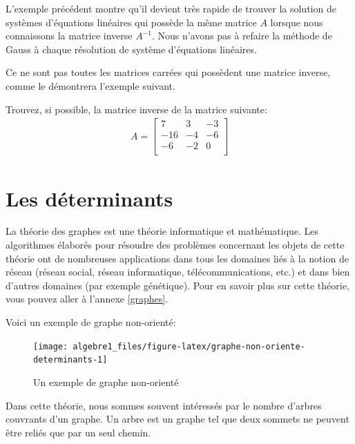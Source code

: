 \documentclass[]{book}
\theoremstyle{definition}
\theoremstyle{definition}
\theoremstyle{definition}
\theoremstyle{remark}
\let\BeginKnitrBlock\begin \let\EndKnitrBlock\end
\begin{document}
L'exemple précédent montre qu'il devient très rapide de trouver la solution de systèmes d'équations linéaires qui possède la même matrice \(A\) lorsque nous connaissons la matrice inverse \(A^{-1}\). Nous n'avons pas à refaire la méthode de Gauss à chaque résolution de système d'équations linéaires.

Ce ne sont pas toutes les matrices carrées qui possèdent une matrice inverse, comme le démontrera l'exemple suivant.

\BeginKnitrBlock{example}
\protect\hypertarget{exm:unnamed-chunk-83}{}{\label{exm:unnamed-chunk-83} }Trouvez, si possible, la matrice inverse de la matrice suivante:
\begin{align*}
A=\begin{bmatrix}
7&3&-3\\
-16&-4&-6\\
-6&-2&0\\
\end{bmatrix}
\end{align*}
\EndKnitrBlock{example}

\hypertarget{determinants}{%
\chapter{Les déterminants}\label{determinants}}

La théorie des graphes est une théorie informatique et mathématique. Les algorithmes élaborés pour résoudre des problèmes concernant les objets de cette théorie ont de nombreuses applications dans tous les domaines liés à la notion de réseau (réseau social, réseau informatique, télécommunications, etc.) et dans bien d'autres domaines (par exemple génétique). Pour en savoir plus sur cette théorie, vous pouvez aller à l'annexe \ref{graphes}.

Voici un exemple de graphe non-orienté:

\begin{figure}

{\centering \texttt{[image: algebre1\_files/figure-latex/graphe-non-oriente-determinants-1]} 

}

\caption{Un exemple de graphe non-orienté}\label{fig:graphe-non-oriente-determinants}
\end{figure}

Dans cette théorie, nous sommes souvent intéressés par le nombre d'arbres couvrants d'un graphe. Un arbre est un graphe tel que deux sommets ne peuvent être reliés que par un seul chemin.
\end{document}
